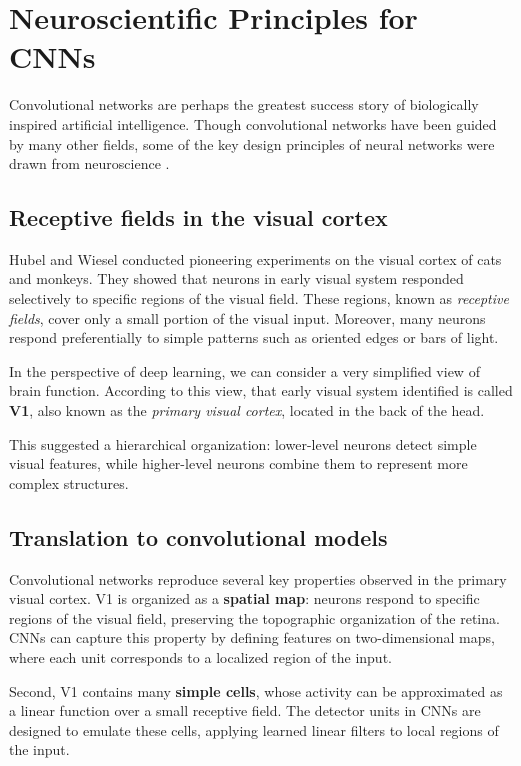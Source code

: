 \chapter{Neuroscientific Principles for CNNs}

Convolutional networks are perhaps the greatest success story of biologically inspired artificial intelligence. Though convolutional networks have been guided by many other fields, some of the key design principles of neural networks were drawn from neuroscience \cite{goodfellow2016deep}.  

\section{Receptive fields in the visual cortex}

Hubel and Wiesel \cite{hubel1968} conducted pioneering experiments on the visual cortex of cats and monkeys. They showed that neurons in early visual system responded selectively to specific regions of the visual field. These regions, known as \textit{receptive fields}, cover only a small portion of the visual input. Moreover, many neurons respond preferentially to simple patterns such as oriented edges or bars of light.

In the perspective of deep learning, we can consider a very simplified view of brain function. According to this view, that early visual system identified is called \textbf{V1}, also known as the \textit{primary visual cortex}, located in the back of the head.

This suggested a hierarchical organization: lower-level neurons detect simple visual features, while higher-level neurons combine them to represent more complex structures.  

\section{Translation to convolutional models}

Convolutional networks reproduce several key properties observed in the primary visual cortex. V1 is organized as a \textbf{spatial map}: neurons respond to specific regions of the visual field, preserving the topographic organization of the retina.  
CNNs can capture this property by defining features on two-dimensional maps, where each unit corresponds to a localized region of the input.  

Second, V1 contains many \textbf{simple cells}, whose activity can be approximated as a linear function over a small receptive field.  
The detector units in CNNs are designed to emulate these cells, applying learned linear filters to local regions of the input.  


